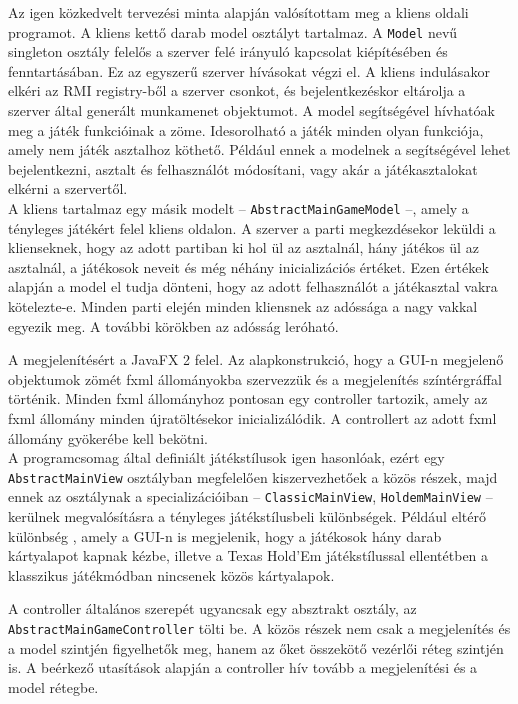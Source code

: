 Az igen közkedvelt tervezési minta alapján valósítottam meg a kliens oldali programot.
A kliens kettő darab model osztályt tartalmaz. A \texttt{Model} nevű singleton osztály felelős a szerver felé irányuló kapcsolat kiépítésében és fenntartásában. Ez az egyszerű szerver hívásokat végzi el. A kliens indulásakor elkéri az RMI registry-ből a szerver csonkot, és bejelentkezéskor eltárolja a szerver által generált munkamenet objektumot. A model segítségével hívhatóak meg a játék funkcióinak a zöme. Idesorolható a játék minden olyan funkciója, amely nem játék asztalhoz köthető. Például ennek a modelnek a segítségével lehet bejelentkezni, asztalt és felhasználót módosítani, vagy akár a játékasztalokat elkérni a szervertől. \\
A kliens tartalmaz egy másik modelt -- \texttt{AbstractMainGameModel} --, amely a tényleges játékért felel kliens oldalon. A szerver a parti megkezdésekor leküldi a klienseknek, hogy az adott partiban ki hol ül az asztalnál, hány játékos ül az asztalnál, a játékosok neveit és még néhány inicializációs értéket. Ezen értékek alapján a model el tudja dönteni, hogy az adott felhasználót a játékasztal vakra kötelezte-e. Minden parti elején minden kliensnek az adóssága a nagy vakkal egyezik meg. A további körökben az adósság leróható.

A megjelenítésért a JavaFX 2 \cite{javafx} felel. Az alapkonstrukció, hogy a GUI-n megjelenő objektumok zömét fxml állományokba szervezzük és a megjelenítés színtérgráffal történik. Minden fxml állományhoz pontosan egy controller tartozik, amely az fxml állomány minden újratöltésekor inicializálódik. A controllert az adott fxml állomány gyökerébe kell bekötni. \\
A programcsomag által definiált játékstílusok igen hasonlóak, ezért egy \texttt{AbstractMainView} osztályban megfelelően kiszervezhetőek a közös részek, majd ennek az osztálynak a specializációiban -- \texttt{ClassicMainView}, \texttt{HoldemMainView} -- kerülnek megvalósításra a tényleges játékstílusbeli különbségek. Például eltérő különbség , amely a GUI-n is megjelenik, hogy a játékosok hány darab kártyalapot kapnak kézbe, illetve a Texas Hold'Em játékstílussal ellentétben a klasszikus játékmódban nincsenek közös kártyalapok.

A controller általános szerepét ugyancsak egy absztrakt osztály, az \texttt{AbstractMainGameController} tölti be. A közös részek nem csak a megjelenítés és a model szintjén figyelhetők meg, hanem az őket összekötő vezérlői réteg szintjén is. A beérkező utasítások alapján a controller hív tovább a megjelenítési és a model rétegbe.

